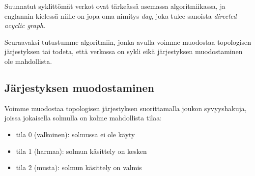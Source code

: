 Suunnatut syklittömät verkot ovat tärkeässä asemassa
algoritmiikassa, ja englannin kielessä niille on jopa
oma nimitys \emph{dag}, joka tulee sanoista
\emph{directed acyclic graph}.

Seuraavaksi tutustumme algoritmiin,
jonka avulla voimme muodostaa topologisen järjestyksen
tai todeta, että verkossa on sykli eikä järjestyksen
muodostaminen ole mahdollista.

\subsection{Järjestyksen muodostaminen}

Voimme muodostaa topologisen järjestyksen suorittamalla
joukon syvyyshakuja, joissa jokaisella solmulla on kolme mahdollista tilaa:

\begin{itemize}
\item tila 0 (valkoinen): solmussa ei ole käyty
\item tila 1 (harmaa): solmun käsittely on kesken
\item tila 2 (musta): solmun käsittely on valmis
\end{itemize}

